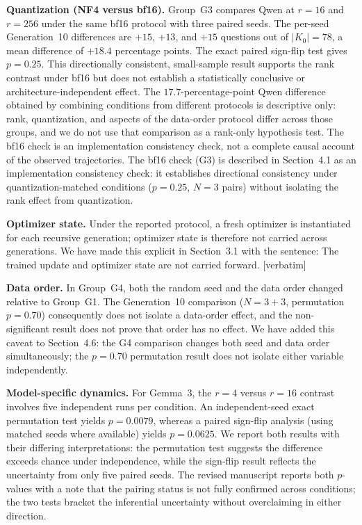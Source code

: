 \documentclass[11pt,a4paper]{article}
\newcommand{\newtext}[1]{#1}
\newcommand{\newtext}[1]{\textcolor{chgcolor}{``#1''}}
\begin{document}
\textbf{Quantization (NF4 versus bf16).}
Group~G3 compares Qwen at $r=16$ and $r=256$ under the same bf16 protocol
with three paired seeds. The per-seed Generation~10 differences are $+15$,
$+13$, and $+15$ questions out of $|K_0|=78$, a mean difference of
$+18.4$ percentage points. The exact paired sign-flip test gives $p=0.25$.
This directionally consistent, small-sample result supports the rank
contrast under bf16 but does not establish a statistically conclusive or
architecture-independent effect. The $17.7$-percentage-point Qwen
difference obtained by combining conditions from different protocols is
descriptive only: rank, quantization, and aspects of the data-order
protocol differ across those groups, and we do not use that comparison as
a rank-only hypothesis test. The bf16 check is an implementation
consistency check, not a complete causal account of the observed
trajectories. The bf16 check (G3) is described in Section~4.1 as an
implementation consistency check: it establishes directional consistency
under quantization-matched conditions ($p=0.25$, $N=3$ pairs) without
isolating the rank effect from quantization.

\textbf{Optimizer state.}
Under the reported protocol, a fresh optimizer is instantiated for each
recursive generation; optimizer state is therefore not carried across
generations. We have made this explicit in Section~3.1 with the sentence:
\newtext{The trained update and optimizer state are not carried forward.} [verbatim]

\textbf{Data order.}
In Group~G4, both the random seed and the data order changed relative
to Group~G1. The Generation~10 comparison ($N=3+3$, permutation
$p=0.70$) consequently does not isolate a data-order effect, and the
non-significant result does not prove that order has no effect. We have
added this caveat to Section~4.6: the G4 comparison changes both seed
and data order simultaneously; the $p=0.70$ permutation result does
not isolate either variable independently.

\textbf{Model-specific dynamics.}
For Gemma~3, the $r=4$ versus $r=16$ contrast involves five independent
runs per condition. An independent-seed exact permutation test yields
$p=0.0079$, whereas a paired sign-flip analysis (using matched seeds
where available) yields $p=0.0625$. We report both results with their
differing interpretations: the permutation test suggests the difference
exceeds chance under independence, while the sign-flip result reflects
the uncertainty from only five paired seeds. The revised manuscript reports both $p$-values with a note
that the pairing status is not fully confirmed across conditions;
the two tests bracket the inferential uncertainty without overclaiming
in either direction.
\end{document}
